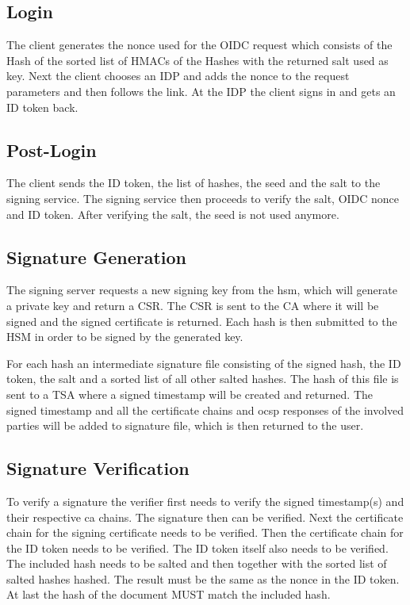 \subsection{Login}
The client generates the nonce used for the \gls{OIDC} request which consists of the Hash of the sorted list of \gls{HMAC}s of the Hashes with the returned salt used as key. 
Next the client chooses an \gls{IDP} and adds the nonce to the request parameters and then follows the link. At the \gls{IDP} the client signs in and gets an ID token back.

\subsection{Post-Login}
The client sends the ID token, the list of hashes, the seed and the salt to the signing service. The signing service then proceeds to verify the salt, OIDC nonce and ID token.
After verifying the salt, the seed is not used anymore.

\subsection{Signature Generation}
The signing server requests a new signing key from the hsm, which will generate a private key and return a \gls{CSR}.
The \gls{CSR} is sent to the \gls{CA} where it will be signed and the signed certificate is returned.
Each hash is then submitted to the \gls{HSM} in order to be signed by the generated key.

For each hash an intermediate signature file consisting of the signed hash, the ID token, the salt and a sorted list of all other salted hashes.
The hash of this file is sent to a \gls{TSA} where a signed timestamp will be created and returned.
The signed timestamp and all the certificate chains and ocsp responses of the involved parties will be added to signature file, which is then returned to the user.

\subsection{Signature Verification}
To verify a signature the verifier first needs to verify the signed timestamp(s) and their respective ca chains.
The signature then can be verified.
Next the certificate chain for the signing certificate needs to be verified.
Then the certificate chain for the ID token needs to be verified.
The ID token itself also needs to be verified.
The included hash needs to be salted and then together with the sorted list of salted hashes hashed.
The result must be the same as the nonce in the ID token.
At last the hash of the document MUST match the included hash.

